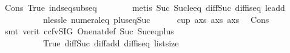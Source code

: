 \begin{isabellebody}
\ Cons{\isacharparenleft}{\kern0pt}{}{\isacharparenright}{\kern0pt}\ True\ ind{\isacharunderscore}{\kern0pt}seq{\isacharunderscore}{\kern0pt}subseq\isanewline
\ \ \ \ \ \ \isamarkupfalse%
\ {\isacharparenleft}{\kern0pt}metis\ Suc{\isacharunderscore}{\kern0pt}{}\ Suc{\isacharunderscore}{\kern0pt}le{\isacharunderscore}{\kern0pt}eq\ diff{\isacharunderscore}{\kern0pt}Suc{\isacharunderscore}{\kern0pt}{}\ diff{\isacharunderscore}{\kern0pt}is{\isacharunderscore}{\kern0pt}{}{\isacharunderscore}{\kern0pt}eq\ le{\isacharunderscore}{\kern0pt}add{}\isanewline
\ \ \ \ \ \ \ \ \ \ nless{\isacharunderscore}{\kern0pt}le\ numeral{\isacharunderscore}{\kern0pt}{}{\isacharunderscore}{\kern0pt}eq{\isacharunderscore}{\kern0pt}{}\ plus{\isacharunderscore}{\kern0pt}{}{\isacharunderscore}{\kern0pt}eq{\isacharunderscore}{\kern0pt}Suc{\isacharparenright}{\kern0pt}\isanewline
\ \ \ \ \isamarkupfalse%
\ {\isachardoublequoteopen}cup{}\ {\isacharparenleft}{\kern0pt}{\isacharparenleft}{\kern0pt}a{\isacharhash}{\kern0pt}xs{\isacharparenright}{\kern0pt}{\isacharbang}{\kern0pt}{}{\isacharparenright}{\kern0pt}\ {\isacharparenleft}{\kern0pt}{\isacharparenleft}{\kern0pt}a{\isacharhash}{\kern0pt}xs{\isacharparenright}{\kern0pt}{\isacharbang}{\kern0pt}{}{\isacharparenright}{\kern0pt}\ {\isacharparenleft}{\kern0pt}{\isacharparenleft}{\kern0pt}a{\isacharhash}{\kern0pt}xs{\isacharparenright}{\kern0pt}{\isacharbang}{\kern0pt}{}{\isacharparenright}{\kern0pt}{\isachardoublequoteclose}\ \isamarkupfalse%
\ Cons{\isacharparenleft}{\kern0pt}{}{\isacharparenright}{\kern0pt}\isanewline
\ \ \ \ \ \ \isamarkupfalse%
\ {\isacharparenleft}{\kern0pt}smt\ {\isacharparenleft}{\kern0pt}verit{\isacharcomma}{\kern0pt}\ ccfv{\isacharunderscore}{\kern0pt}SIG{\isacharparenright}{\kern0pt}\ One{\isacharunderscore}{\kern0pt}nat{\isacharunderscore}{\kern0pt}def\ Suc{\isacharunderscore}{\kern0pt}{}\ Suc{\isacharunderscore}{\kern0pt}eq{\isacharunderscore}{\kern0pt}plus{}\isanewline
\ \ \ \ \ \ \ \ \ \ True\ diff{\isacharunderscore}{\kern0pt}Suc{\isacharunderscore}{\kern0pt}{}\ diff{\isacharunderscore}{\kern0pt}add{\isacharunderscore}{\kern0pt}{}\ diff{\isacharunderscore}{\kern0pt}is{\isacharunderscore}{\kern0pt}{}{\isacharunderscore}{\kern0pt}eq\ list{\isachardot}{\kern0pt}size{\isacharparenleft}{\kern0pt}{}{\isacharcomma}{\kern0pt}{}{\isacharparenright}{\kern0pt}\isanewline

\end{isabellebody}
